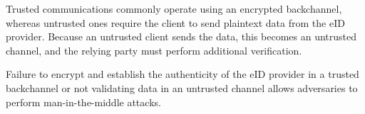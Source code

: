Trusted communications commonly operate using an encrypted backchannel, whereas untrusted ones require the client to send plaintext data from the eID provider. Because an untrusted client sends the data, this becomes an untrusted channel, and the relying party must perform additional verification.

Failure to encrypt and establish the authenticity of the eID provider in a trusted backchannel or not validating data in an untrusted channel allows adversaries to perform man-in-the-middle attacks.